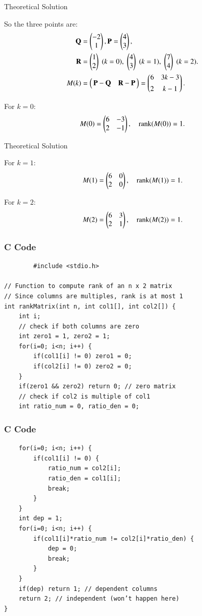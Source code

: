 \documentclass{beamer}
\begin{document}
\begin{frame}{Theoretical Solution}

So the three points are:
\begin{align}
\mathbf{Q} &= \begin{pmatrix}-2 \\ 1\end{pmatrix}, 
\mathbf{P} = \begin{pmatrix}4 \\ 3\end{pmatrix}, \\
\mathbf{R} &= \begin{pmatrix}1 \\ 2\end{pmatrix}\;(k=0),\; \begin{pmatrix}4 \\ 3\end{pmatrix}\;(k=1),\; \begin{pmatrix}7 \\ 4\end{pmatrix}\;(k=2).\\
M(k) &= \begin{pmatrix}\,\mathbf{P}-\mathbf{Q} & \mathbf{R}-\mathbf{P}\,\end{pmatrix} 
     = \begin{pmatrix}6 & 3k-3 \\[4pt] 2 & k-1\end{pmatrix}.
\end{align}

For $k=0$:
\begin{align}
M(0) = \begin{pmatrix}6 & -3 \\ 2 & -1\end{pmatrix}, \quad \text{rank}(M(0))=1.
\end{align}
\end{frame}
\begin{frame}{Theoretical Solution}

For $k=1$:
\begin{align}
M(1) = \begin{pmatrix}6 & 0 \\ 2 & 0\end{pmatrix}, \quad \text{rank}(M(1))=1.
\end{align}

For $k=2$:
\begin{align}
M(2) = \begin{pmatrix}6 & 3 \\ 2 & 1\end{pmatrix}, \quad \text{rank}(M(2))=1.
\end{align}

\end{frame}
\begin{frame}[fragile]
    \frametitle{C Code}
    \begin{lstlisting}
        #include <stdio.h>

// Function to compute rank of an n x 2 matrix
// Since columns are multiples, rank is at most 1
int rankMatrix(int n, int col1[], int col2[]) {
    int i;
    // check if both columns are zero
    int zero1 = 1, zero2 = 1;
    for(i=0; i<n; i++) {
        if(col1[i] != 0) zero1 = 0;
        if(col2[i] != 0) zero2 = 0;
    }
    if(zero1 && zero2) return 0; // zero matrix
    // check if col2 is multiple of col1
    int ratio_num = 0, ratio_den = 0;
    \end{lstlisting}
    \end{frame}
\begin{frame}[fragile]
    \frametitle{C Code}
    \begin{lstlisting}
    for(i=0; i<n; i++) {
        if(col1[i] != 0) {
            ratio_num = col2[i];
            ratio_den = col1[i];
            break;
        }
    }
    int dep = 1;
    for(i=0; i<n; i++) {
        if(col1[i]*ratio_num != col2[i]*ratio_den) {
            dep = 0;
            break;
        }
    }
    if(dep) return 1; // dependent columns
    return 2; // independent (won’t happen here)
}
\end{lstlisting}
    \end{frame}
\end{document}
